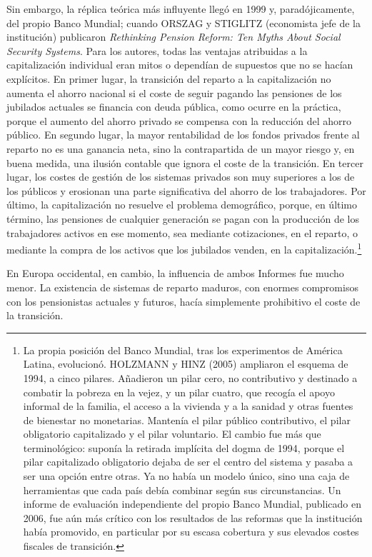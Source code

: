 \documentclass[10pt,a4paper]{article}
\begin{document}
Sin embargo, la réplica teórica más influyente llegó en 1999 y, paradójicamente, del propio Banco Mundial; cuando ORSZAG y STIGLITZ (economista jefe de la institución) publicaron \textit{Rethinking Pension Reform: Ten Myths About Social Security Systems}. Para los autores, todas las ventajas atribuidas a la capitalización individual eran mitos o dependían de supuestos que no se hacían explícitos. En primer lugar, la transición del reparto a la capitalización no aumenta el ahorro nacional si el coste de seguir pagando las pensiones de los jubilados actuales se financia con deuda pública, como ocurre en la práctica, porque el aumento del ahorro privado se compensa con la reducción del ahorro público. En segundo lugar, la mayor rentabilidad de los fondos privados frente al reparto no es una ganancia neta, sino la contrapartida de un mayor riesgo y, en buena medida, una ilusión contable que ignora el coste de la transición. En tercer lugar, los costes de gestión de los sistemas privados son muy superiores a los de los públicos y erosionan una parte significativa del ahorro de los trabajadores. Por último, la capitalización no resuelve el problema demográfico, porque, en último término, las pensiones de cualquier generación se pagan con la producción de los trabajadores activos en ese momento, sea mediante cotizaciones, en el reparto, o mediante la compra de los activos que los jubilados venden, en la capitalización.\footnote{La propia posición del Banco Mundial, tras los experimentos de América Latina, evolucionó. HOLZMANN y HINZ (2005) ampliaron el esquema de 1994, a cinco pilares. Añadieron un pilar cero, no contributivo y destinado a combatir la pobreza en la vejez, y un pilar cuatro, que recogía el apoyo informal de la familia, el acceso a la vivienda y a la sanidad y otras fuentes de bienestar no monetarias. Mantenía el pilar público contributivo, el pilar obligatorio capitalizado y el pilar voluntario. El cambio fue más que terminológico: suponía la retirada implícita del dogma de 1994, porque el pilar capitalizado obligatorio dejaba de ser el centro del sistema y pasaba a ser una opción entre otras. Ya no había un modelo único, sino una caja de herramientas que cada país debía combinar según sus circunstancias. Un informe de evaluación independiente del propio Banco Mundial, publicado en 2006, fue aún más crítico con los resultados de las reformas que la institución había promovido, en particular por su escasa cobertura y sus elevados costes fiscales de transición.
}

En Europa occidental, en cambio, la influencia de ambos Informes fue mucho menor. La existencia de sistemas de reparto maduros, con enormes compromisos con los pensionistas actuales y futuros, hacía simplemente prohibitivo el coste de la transición.
\end{document}
